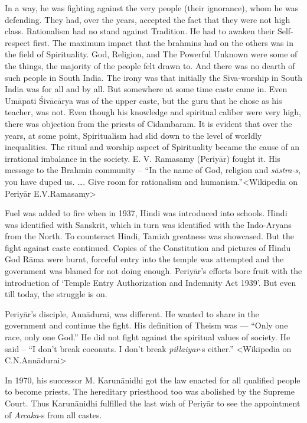 In a way, he was fighting against the very people (their ignorance), whom he was defending. They had, over the years, accepted the fact that they were not high class. Rationalism had no stand against Tradition. He had to awaken their Self-respect first. The maximum impact that the brahmins had on the others was in the field of Spirituality. God, Religion, and The Powerful Unknown were some of the things, the majority of the people felt drawn to. And there was no dearth of such people in South India. The irony was that initially the Siva-worship in South India was for all and by all. But somewhere at some time caste came in. Even Umāpati Śivācārya was of the upper caste, but the guru that he chose as his teacher, was not. Even though his knowledge and spiritual caliber were very high, there was objection from the priests of Cidambaram. It is evident that over the years, at some point, Spiritualism had slid down to the level of worldly inequalities. The ritual and worship aspect of Spirituality became the cause of an irrational imbalance in the society. E. V. Ramasamy (Periyār) fought it. His message to the Brahmin community – “In the name of God, religion and \textit{sāstra-s}, you have duped us. …. Give room for rationalism and humanism.”\textless Wikipedia on Periyār E.V.Ramasamy\textgreater 

Fuel was added to fire when in 1937, Hindi was introduced into schools. Hindi was identified with Sanskrit, which in turn was identified with the Indo-Aryans from the North. To counteract Hindi, Tamizh greatness was showcased. But the fight against caste continued. Copies of the Constitution and pictures of Hindu God Rāma were burnt, forceful entry into the temple was attempted and the government was blamed for not doing enough. Periyār’s efforts bore fruit with the introduction of ‘Temple Entry Authorization and Indemnity Act 1939’. But even till today, the struggle is on.

Periyār’s disciple, Annādurai, was different. He wanted to share in the government and continue the fight. His definition of Theism was --- “Only one race, only one God.” He did not fight against the spiritual values of society. He said – “I don’t break coconuts. I don’t break \textit{pillaiyar}-s either.” \textless Wikipedia on C.N.Annādurai\textgreater 

In 1970, his successor M. Karunānidhi got the law enacted for all qualified people to become priests. The hereditary priesthood too was abolished by the Supreme Court. Thus Karunānidhi fulfilled the last wish of Periyār to see the appointment of \textit{Arcaka}-s from all castes.

